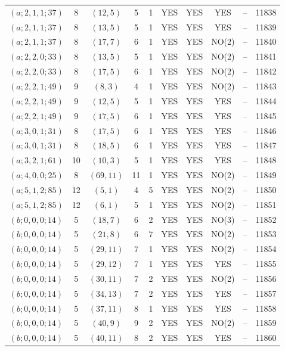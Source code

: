 \begin{longtable}{|c|c|c|c|c|c|c|c|c|c|}
$(a; 2, 1, 1; 37)$ & 8 & $(12, 5)$ & 5 & 1 & YES & YES & YES & -- & 11838\\
$(a; 2, 1, 1; 37)$ & 8 & $(13, 5)$ & 5 & 1 & YES & YES & YES & -- & 11839\\
$(a; 2, 1, 1; 37)$ & 8 & $(17, 7)$ & 6 & 1 & YES & YES & NO(2) & -- & 11840\\
$(a; 2, 2, 0; 33)$ & 8 & $(13, 5)$ & 5 & 1 & YES & YES & NO(2) & -- & 11841\\
$(a; 2, 2, 0; 33)$ & 8 & $(17, 5)$ & 6 & 1 & YES & YES & NO(2) & -- & 11842\\
$(a; 2, 2, 1; 49)$ & 9 & $(8, 3)$ & 4 & 1 & YES & YES & NO(2) & -- & 11843\\
$(a; 2, 2, 1; 49)$ & 9 & $(12, 5)$ & 5 & 1 & YES & YES & YES & -- & 11844\\
$(a; 2, 2, 1; 49)$ & 9 & $(17, 5)$ & 6 & 1 & YES & YES & YES & -- & 11845\\
$(a; 3, 0, 1; 31)$ & 8 & $(17, 5)$ & 6 & 1 & YES & YES & YES & -- & 11846\\
$(a; 3, 0, 1; 31)$ & 8 & $(18, 5)$ & 6 & 1 & YES & YES & YES & -- & 11847\\
$(a; 3, 2, 1; 61)$ & 10 & $(10, 3)$ & 5 & 1 & YES & YES & YES & -- & 11848\\
$(a; 4, 0, 0; 25)$ & 8 & $(69, 11)$ & 11 & 1 & YES & YES & NO(2) & -- & 11849\\
$(a; 5, 1, 2; 85)$ & 12 & $(5, 1)$ & 4 & 5 & YES & YES & NO(2) & -- & 11850\\
$(a; 5, 1, 2; 85)$ & 12 & $(6, 1)$ & 5 & 1 & YES & YES & NO(2) & -- & 11851\\
$(b; 0, 0, 0; 14)$ & 5 & $(18, 7)$ & 6 & 2 & YES & YES & NO(3) & -- & 11852\\
$(b; 0, 0, 0; 14)$ & 5 & $(21, 8)$ & 6 & 7 & YES & YES & NO(2) & -- & 11853\\
$(b; 0, 0, 0; 14)$ & 5 & $(29, 11)$ & 7 & 1 & YES & YES & NO(2) & -- & 11854\\
$(b; 0, 0, 0; 14)$ & 5 & $(29, 12)$ & 7 & 1 & YES & YES & YES & -- & 11855\\
$(b; 0, 0, 0; 14)$ & 5 & $(30, 11)$ & 7 & 2 & YES & YES & NO(2) & -- & 11856\\
$(b; 0, 0, 0; 14)$ & 5 & $(34, 13)$ & 7 & 2 & YES & YES & YES & -- & 11857\\
$(b; 0, 0, 0; 14)$ & 5 & $(37, 11)$ & 8 & 1 & YES & YES & YES & -- & 11858\\
$(b; 0, 0, 0; 14)$ & 5 & $(40, 9)$ & 9 & 2 & YES & YES & NO(2) & -- & 11859\\
$(b; 0, 0, 0; 14)$ & 5 & $(40, 11)$ & 8 & 2 & YES & YES & YES & -- & 11860\\

\end{longtable}
